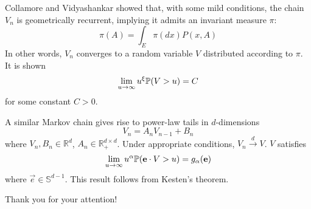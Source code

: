 \documentclass{beamer}
\begin{document}
\begin{frame}
  Collamore and Vidyashankar showed that,
  with some mild conditions, the chain $V_n$ is geometrically
  recurrent, implying it admits an invariant
  measure $\pi$:
  \[
  \pi(A) = \int_E \pi(dx) P(x, A)
  \]
  In other words, $V_n$ converges to a random variable $V$ distributed
  according to $\pi$. It is shown
  \[
   \lim_{u \to \infty} u^\xi \P(V > u) = C
  \]
  for some constant $C > 0$.
\end{frame}

\begin{frame}
  A similar Markov chain gives rise to power-law tails in $d$-dimensions
  \[
  V_n = A_n V_{n-1} + B_n
  \]
  where $V_n, B_n \in \mathbb R^d$,
  $A_n \in \mathbb R_+^{d \times d}$.
  Under appropriate conditions,
  $V_n \overset{d}{\to} V$. $V$ satisfies
  \[
  \lim_{u \to \infty} u^\alpha\P(\vec{e} \cdot V > u) = g_\alpha(\vec{e})
  \]
  where $\vec{e} \in \mathbb S^{d-1}$. This result follows from
  Kesten's theorem.
\end{frame}

\begin{frame}
  \centering
  Thank you for your attention!
\end{frame}


% 
\end{document}
